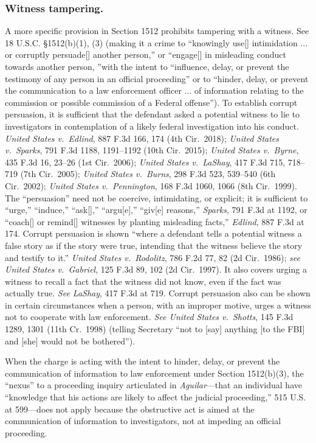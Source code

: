 \subsubsection*{Witness tampering.}

A more specific provision in Section 1512 prohibits tampering with a witness.
See 18 U.S.C. \S 1512(b)(1), (3) (making it a crime to “knowingly use[] intimidation ... or corruptly persuade[] another person,” or “engage[] in misleading conduct towards another person, ”with the intent to “influence, delay, or prevent the testimony of any person in an official proceeding” or to “hinder, delay, or prevent the communication to a law enforcement officer ... of information relating to the commission or possible commission of a Federal offense”).
To establish corrupt persuasion, it is sufficient that the defendant asked a potential witness to lie to investigators in contemplation of a likely federal investigation into his conduct.
\textit{United States v.\ Edlind}, 887 F.3d 166, 174 (4th Cir.~2018);
\textit{United States v.\ Sparks}, 791 F.3d 1188, 1191--1192 (10th Cir.~2015);
\textit{United States v.\ Byrne}, 435 F.3d 16, 23--26 (1st Cir.~2006);
\textit{United States v.\ LaShay}, 417 F.3d 715, 718--719 (7th Cir.~2005);
\textit{United States v.\ Burns}, 298 F.3d 523, 539--540 (6th Cir.~2002);
\textit{United States v.\ Pennington}, 168 F.3d 1060, 1066 (8th Cir.~1999).
The “persuasion” need not be coercive, intimidating, or explicit;
it is sufficient to “urge,” “induce,” “ask[],” “argu[e],” “giv[e] reasons,”
\textit{Sparks}, 791 F.3d at 1192, or “coach[] or remind[] witnesses by planting misleading facts,”
\textit{Edlind}, 887 F.3d at 174.
Corrupt persuasion is shown “where a defendant tells a potential witness a false story as if the story were true, intending that the witness believe the story and testify to it.”
\textit{United States v.\ Rodolitz}, 786 F.2d 77, 82 (2d Cir.~1986);
\textit{see United States v.\ Gabriel}, 125 F.3d 89, 102 (2d Cir.~1997).
It also covers urging a witness to recall a fact that the witness did not know, even if the fact was actually true.
\textit{See LaShay}, 417 F.3d at 719.
Corrupt persuasion also can be shown in certain circumstances when a person, with an improper motive, urges a witness not to cooperate with law enforcement.
\textit{See United States v.\ Shotts}, 145 F.3d 1289, 1301 (11th Cr.~1998) (telling Secretary “not to [say] anything [to the FBI] and [she] would not be bothered”).

When the charge is acting with the intent to hinder, delay, or prevent the communication of information to law enforcement under Section 1512(b)(3), the “nexus” to a proceeding inquiry articulated in \textit{Aguilar}---that an individual have “knowledge that his actions are likely to affect the judicial proceeding,” 515 U.S. at 599---does not apply because the obstructive act is aimed at the communication of information to investigators, not at impeding an official proceeding.

